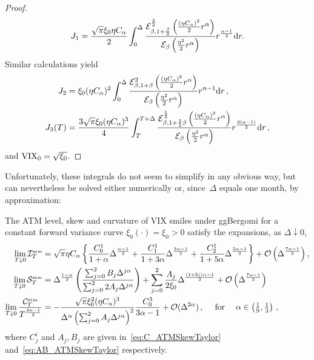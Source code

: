 \begin{proof}
\begin{equation}
    J_1 = \frac{\sqrt{\pi}\xi_0 \eta C_{\alpha}}2 \int_0^{\Delta} \frac{\mathcal{E}_{\beta, 1 + \frac\beta2}^{\frac32} \left(\frac{(\eta C_{\alpha})^2}2 r^\alpha\right)}{\mathcal{E}_{\beta}\left(\frac{\eta^2}2 r^\alpha\right)} r^{\frac{\alpha-1}2} \mathrm{d} r.
\end{equation}
Similar calculations yield
\begin{align*}
    J_2 &= \xi_0 (\eta C_\alpha)^2 \int_0^\Delta \frac{\mathcal{E}_{\beta, 1 + \beta}^{2} \left(\frac{(\eta C_{\alpha})^2}2 r^\alpha\right)}{\mathcal{E}_{\beta}\left(\frac{\eta^2}2 r^\alpha\right)} r^{\alpha-1} \mathrm{d} r\,, \\
    J_3(T) &= \frac{3\sqrt{\pi}\xi_0 (\eta C_\alpha)^3}4 \int_T^{T+\Delta} \frac{\mathcal{E}_{\beta, 1 + \frac32\beta}^{\frac52} \left(\frac{(\eta C_{\alpha})^2}2 r^\alpha\right)}{\mathcal{E}_{\beta}\left(\frac{\eta^2}2 r^\alpha\right)} r^{\frac{3(\alpha-1)}2} \mathrm{d} r\,,
\end{align*}
and
$\mathrm{VIX}_0 = \sqrt{\xi_0}$.
\end{proof}
Unfortunately, these integrals do not seem to simplify in any obvious way, 
but can nevertheless be solved either numerically or, since~$\Delta$ equals one month, by approximation:
\newpage
\begin{corollary}\label{cor:ATMSkewTaylor}
The ATM level, skew and curvature of VIX smiles under ggBergomi for a constant forward variance curve $\xi_0(\cdot)=\xi_0>0$ satisfy the expansions,
as $\Delta\downarrow 0$,
\begin{equation}
\begin{aligned}
    \lim_{T\downarrow 0}\mathcal{I}^{\textup{\tiny atm}}_T &= \sqrt{\pi} \eta C_{\alpha} \left\{ \frac{C_0^1}{1+\alpha} 
 \Delta^{\frac{\alpha-1}{2}} + \frac{C_1^1}{1+3\alpha} 
 \Delta^{\frac{3\alpha-1}{2}}  + \frac{C_2^1}{1+5\alpha} 
 \Delta^{\frac{5\alpha-1}{2}}\right\} + \mathcal{O}\left(\Delta^{\frac{7\alpha - 1}2}\right), \\
 \lim_{T\downarrow 0}\mathcal{S}^{\textup{\tiny atm}}_T &= \Delta^{\frac{1-\alpha}2} \left(\frac{\sum_{j=0}^2 B_j \Delta^{j\alpha}}{\sum_{j=0}^2 2A_j \Delta^{j\alpha}}\right) + \sum_{j=0}^2 \frac{A_j}{2\xi_0} \Delta^{\frac{(1+2j)\alpha-1}{2}} + \mathcal{O}\left(\Delta^{\frac{7\alpha - 1}{2}}\right) \\
\lim_{T\downarrow 0}\frac{\mathcal{C}^{\textup{\tiny atm}}_T}{T^{\frac{3\alpha-1}{2}}} &= - \frac{\sqrt{\pi}\xi_0^2(\eta C_{\alpha})^3}{\Delta^{\alpha}\left(\sum_{j=0}^2 A_j \Delta^{j\alpha}\right)^2} \frac{C_0^3}{3\alpha-1} + \mathcal{O}(\Delta^{2\alpha})\,, \quad \textup{ for } \quad \textstyle \alpha\in\left(\frac19, \frac13\right)\,,
\end{aligned}
\end{equation}
where $C^i_j$ and $A_j, B_j$ are given in~\eqref{eq:C_ATMSkewTaylor} and~\eqref{eq:AB_ATMSkewTaylor} respectively.
\end{corollary}
